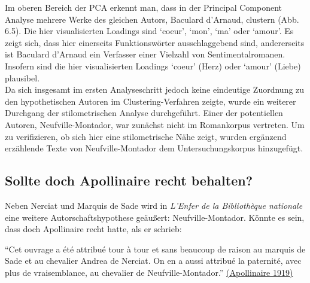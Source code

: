 \documentclass[
  letterpaper,
  DIV=11,
  numbers=noendperiod]{scrreprt}
\begin{document}
Im oberen Bereich der PCA erkennt man, dass in der Principal Component
Analyse mehrere Werke des gleichen Autors, Baculard d'Arnaud, clustern
(Abb. 6.5). Die hier visualisierten Loadings sind `coeur', `mon', `ma'
oder `amour'. Es zeigt sich, dass hier einerseits Funktionswörter
ausschlaggebend sind, andererseits ist Baculard d'Arnaud ein Verfasser
einer Vielzahl von Sentimentalromanen. Insofern sind die hier
visualisierten Loadings `coeur' (Herz) oder `amour' (Liebe) plausibel.\\
Da sich insgesamt im ersten Analyseschritt jedoch keine eindeutige
Zuordnung zu den hypothetischen Autoren im Clustering-Verfahren zeigte,
wurde ein weiterer Durchgang der stilometrischen Analyse durchgeführt.
Einer der potentiellen Autoren, Neufville-Montador, war zunächst nicht
im Romankorpus vertreten. Um zu verifizieren, ob sich hier eine
stilometrische Nähe zeigt, wurden ergänzend erzählende Texte von
Neufville-Montador dem Untersuchungskorpus hinzugefügt.

\subsection{Sollte doch Apollinaire recht
behalten?}\label{sollte-doch-apollinaire-recht-behalten}

Neben Nerciat und Marquis de Sade wird in \emph{L'Enfer de la
Bibliothèque nationale} eine weitere Autorschaftshypothese geäußert:
Neufville-Montador. Könnte es sein, dass doch Apollinaire recht hatte,
als er schrieb:

``Cet ouvrage a été attribué tour à tour et sans beaucoup de raison au
marquis de Sade et au chevalier Andrea de Nerciat. On en a aussi
attribué la paternité, avec plus de vraisemblance, au chevalier de
Neufville-Montador.''
\href{https://www.zotero.org/google-docs/?WLbiq7}{(Apollinaire 1919)}
\end{document}
